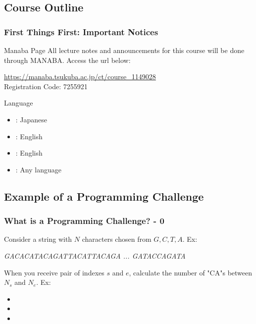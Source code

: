 \documentclass{beamer}
\begin{document}
\subsection{Course Outline}
\begin{frame}
  \frametitle{First Things First: Important Notices}

  \begin{block}{Manaba Page}
    All lecture notes and announcements for this course will be done
    through MANABA. Access the url below:

    \medskip

    \url{https://manaba.tsukuba.ac.jp/ct/course_1149028}\\
    Registration Code: 7255921
  \end{block}
  \begin{exampleblock}{Language}
    \begin{itemize}
      \item {}: Japanese
      \item {}: English
      \item {}: English
      \item {}: Any language
    \end{itemize}
  \end{exampleblock}
\end{frame}



\subsection{Example of a Programming Challenge}
\begin{frame}
  \frametitle{What is a Programming Challenge? - 0}

  Consider a string with $N$ characters chosen from $G,C,T,A$. Ex:

  \begin{center}
    \emph{\alert<2>{GACA\alert<4>{CATACAG}AT}TA\alert<3>{CATTAC}AGA ... GATACCAGATA}
  \end{center}

  When you receive pair of indexes $s$ and $e$, calculate the number of "CA"s between $N_s$ and $N_e$. Ex:

  \begin{itemize}
    \item {}
    \item {}
    \item {}
  \end{itemize}
\end{frame}
\end{document}
